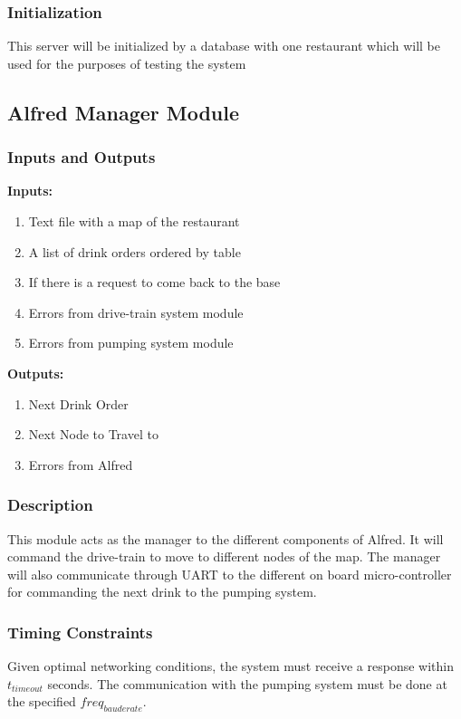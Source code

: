 \documentclass [10pt]{article}
\begin{document}
\subsubsection{Initialization}
This server will be initialized by a database with one restaurant which will be used for the purposes of testing the system

\subsection{Alfred Manager Module}

\subsubsection{Inputs and Outputs}

\textbf{Inputs: } 
\begin{enumerate}
	\item Text file with a map of the restaurant
	\item A list of drink orders ordered by table
	\item If there is a request to come back to the base
	\item Errors from drive-train system module
	\item Errors from pumping system module
\end{enumerate}

\textbf{Outputs: } 
\begin{enumerate}
	\item Next Drink Order
	\item Next Node to Travel to
	\item Errors from Alfred
\end{enumerate}

\subsubsection{Description}
This module acts as the manager to the different components of Alfred. It will command the drive-train to move to different nodes of the map. The manager will also communicate through UART to the different on board micro-controller for commanding the next drink to the pumping system.
\subsubsection{Timing Constraints}
Given optimal networking conditions, the system must receive a response within  $ t_{timeout} $ seconds. The communication with the pumping system must be done at the specified $freq_{bauderate}$.
\end{document}
